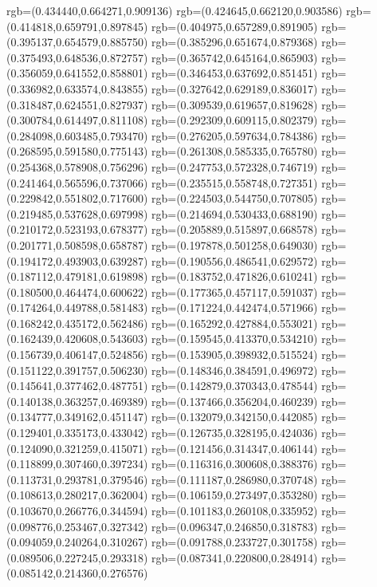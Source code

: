 {{{			rgb=(0.434440,0.664271,0.909136)
			rgb=(0.424645,0.662120,0.903586)
			rgb=(0.414818,0.659791,0.897845)
			rgb=(0.404975,0.657289,0.891905)
			rgb=(0.395137,0.654579,0.885750)
			rgb=(0.385296,0.651674,0.879368)
			rgb=(0.375493,0.648536,0.872757)
			rgb=(0.365742,0.645164,0.865903)
			rgb=(0.356059,0.641552,0.858801)
			rgb=(0.346453,0.637692,0.851451)
			rgb=(0.336982,0.633574,0.843855)
			rgb=(0.327642,0.629189,0.836017)
			rgb=(0.318487,0.624551,0.827937)
			rgb=(0.309539,0.619657,0.819628)
			rgb=(0.300784,0.614497,0.811108)
			rgb=(0.292309,0.609115,0.802379)
			rgb=(0.284098,0.603485,0.793470)
			rgb=(0.276205,0.597634,0.784386)
			rgb=(0.268595,0.591580,0.775143)
			rgb=(0.261308,0.585335,0.765780)
			rgb=(0.254368,0.578908,0.756296)
			rgb=(0.247753,0.572328,0.746719)
			rgb=(0.241464,0.565596,0.737066)
			rgb=(0.235515,0.558748,0.727351)
			rgb=(0.229842,0.551802,0.717600)
			rgb=(0.224503,0.544750,0.707805)
			rgb=(0.219485,0.537628,0.697998)
			rgb=(0.214694,0.530433,0.688190)
			rgb=(0.210172,0.523193,0.678377)
			rgb=(0.205889,0.515897,0.668578)
			rgb=(0.201771,0.508598,0.658787)
			rgb=(0.197878,0.501258,0.649030)
			rgb=(0.194172,0.493903,0.639287)
			rgb=(0.190556,0.486541,0.629572)
			rgb=(0.187112,0.479181,0.619898)
			rgb=(0.183752,0.471826,0.610241)
			rgb=(0.180500,0.464474,0.600622)
			rgb=(0.177365,0.457117,0.591037)
			rgb=(0.174264,0.449788,0.581483)
			rgb=(0.171224,0.442474,0.571966)
			rgb=(0.168242,0.435172,0.562486)
			rgb=(0.165292,0.427884,0.553021)
			rgb=(0.162439,0.420608,0.543603)
			rgb=(0.159545,0.413370,0.534210)
			rgb=(0.156739,0.406147,0.524856)
			rgb=(0.153905,0.398932,0.515524)
			rgb=(0.151122,0.391757,0.506230)
			rgb=(0.148346,0.384591,0.496972)
			rgb=(0.145641,0.377462,0.487751)
			rgb=(0.142879,0.370343,0.478544)
			rgb=(0.140138,0.363257,0.469389)
			rgb=(0.137466,0.356204,0.460239)
			rgb=(0.134777,0.349162,0.451147)
			rgb=(0.132079,0.342150,0.442085)
			rgb=(0.129401,0.335173,0.433042)
			rgb=(0.126735,0.328195,0.424036)
			rgb=(0.124090,0.321259,0.415071)
			rgb=(0.121456,0.314347,0.406144)
			rgb=(0.118899,0.307460,0.397234)
			rgb=(0.116316,0.300608,0.388376)
			rgb=(0.113731,0.293781,0.379546)
			rgb=(0.111187,0.286980,0.370748)
			rgb=(0.108613,0.280217,0.362004)
			rgb=(0.106159,0.273497,0.353280)
			rgb=(0.103670,0.266776,0.344594)
			rgb=(0.101183,0.260108,0.335952)
			rgb=(0.098776,0.253467,0.327342)
			rgb=(0.096347,0.246850,0.318783)
			rgb=(0.094059,0.240264,0.310267)
			rgb=(0.091788,0.233727,0.301758)
			rgb=(0.089506,0.227245,0.293318)
			rgb=(0.087341,0.220800,0.284914)
			rgb=(0.085142,0.214360,0.276576)
}}}
